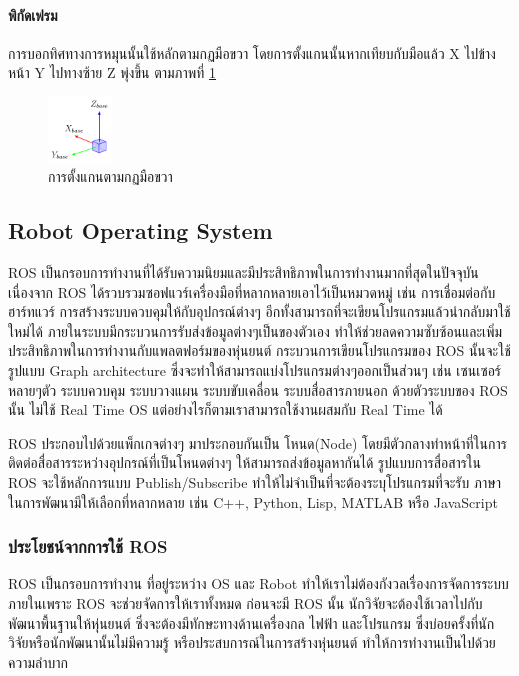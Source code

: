 \paragraph*{พิกัดเฟรม}
การบอกทิศทางการหมุนนั้นใช้หลักตามกฏมือขวา โดยการตั้งแกนนั้นหากเทียบกับมือแล้ว X ไปข้างหน้า Y ไปทางซ้าย Z พุ่งขึ้น ตามภาพที่ \ref{fig:right_hand_rule}
\begin{figure}[!ht]
	\centering
	\includegraphics[width=0.15\textwidth]{chapter2/images/right_hand_rule.png}
	\caption{การตั้งแกนตามกฏมือขวา}
	\label{fig:right_hand_rule}
\end{figure}

\subsection{Robot Operating System}
ROS เป็นกรอบการทำงานที่ได้รับความนิยมและมีประสิทธิภาพในการทำงานมากที่สุดในปัจจุบัน เนื่องจาก ROS
ได้รวบรวมซอฟแวร์เครื่องมือที่หลากหลายเอาไว้เป็นหมวดหมู่ เช่น การเชื่อมต่อกับฮาร์ทแวร์
การสร้างระบบควบคุมให้กับอุปกรณ์ต่างๆ อีกทั้งสามารถที่จะเขียนโปรแกรมแล้วนำกลับมาใช้ใหม่ได้
ภายในระบบมีกระบวนการรับส่งข้อมูลต่างๆเป็นของตัวเอง ทำให้ช่วยลดความซับซ้อนและเพิ่มประสิทธิภาพในการทำงานกับแพลตฟอร์มของหุ่นยนต์
กระบวนการเขียนโปรแกรมของ ROS นั้นจะใช้รูปแบบ Graph architecture ซึ่งจะทำให้สามารถแบ่งโปรแกรมต่างๆออกเป็นส่วนๆ เช่น
เซนเซอร์หลายๆตัว ระบบควบคุม ระบบวางแผน ระบบขับเคลื่อน ระบบสื่อสารภายนอก ด้วยตัวระบบของ ROS นั้น ไม่ใช้ Real Time OS
แต่อย่างไรก็ตามเราสามารถใช้งานผสมกับ Real Time ได้

ROS ประกอบไปด้วยแพ็กเกจต่างๆ มาประกอบกันเป็น โหนด(Node) โดยมีตัวกลางทำหน้าที่ในการติดต่อสื่อสารระหว่างอุปกรณ์ที่เป็นโหนดต่างๆ
ให้สามารถส่งข้อมูลหากันได้ รูปแบบการสื่อสารใน ROS จะใช้หลักการแบบ Publish/Subscribe ทำให้ไม่จำเป็นที่จะต้องระบุโปรแกรมที่จะรับ
ภาษาในการพัฒนามีให้เลือกที่หลากหลาย เช่น C++, Python, Lisp, MATLAB หรือ JavaScript 

\subsubsection*{ประโยชน์จากการใช้ ROS}
ROS เป็นกรอบการทำงาน ที่อยู่ระหว่าง OS และ Robot ทำให้เราไม่ต้องกังวลเรื่องการจัดการระบบภายในเพราะ
ROS จะช่วยจัดการให้เราทั้งหมด ก่อนจะมี ROS นั้น นักวิจัยจะต้องใช้เวลาไปกับพัฒนาพื้นฐานให้หุ่นยนต์
ซึ่งจะต้องมีทักษะทางด้านเครื่องกล ไฟฟ้า และโปรแกรม ซึ่งบ่อยครั้งที่นักวิจัยหรือนักพัฒนานั้นไม่มีความรู้
หรือประสบการณ์ในการสร้างหุ่นยนต์ ทำให้การทำงานเป็นไปด้วยความลำบาก